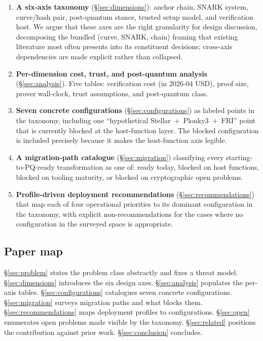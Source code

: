 \begin{enumerate}
  \item \textbf{A six-axis taxonomy} (\S\ref{sec:dimensions}): anchor
    chain, SNARK system, curve/hash pair, post-quantum stance, trusted
    setup model, and verification host. We argue that these axes are
    the right granularity for design discussion, decomposing the
    bundled (curve, SNARK, chain) framing that existing literature
    most often presents into its constituent decisions; cross-axis
    dependencies are made explicit rather than collapsed.
  \item \textbf{Per-dimension cost, trust, and post-quantum
    analysis} (\S\ref{sec:analysis}). Five tables: verification cost
    (in 2026-04 USD), proof size, prover wall-clock, trust
    assumptions, and post-quantum class.
  \item \textbf{Seven concrete configurations}
    (\S\ref{sec:configurations}) as labeled points in the taxonomy,
    including one ``hypothetical Stellar~+~Plonky3~+~FRI'' point that
    is currently blocked at the host-function layer. The blocked
    configuration is included precisely because it makes the
    host-function axis legible.
  \item \textbf{A migration-path catalogue} (\S\ref{sec:migration})
    classifying every starting-to-PQ-ready transformation as one of:
    ready today, blocked on host functions, blocked on tooling
    maturity, or blocked on cryptographic open problems.
  \item \textbf{Profile-driven deployment recommendations}
    (\S\ref{sec:recommendations}) that map each of four operational
    priorities to its dominant configuration in the taxonomy, with
    explicit non-recommendations for the cases where no configuration
    in the surveyed space is appropriate.
\end{enumerate}

\subsection*{Paper map}

\S\ref{sec:problem} states the problem class abstractly and fixes a
threat model. \S\ref{sec:dimensions} introduces the six design axes.
\S\ref{sec:analysis} populates the per-axis tables.
\S\ref{sec:configurations} catalogues seven concrete configurations.
\S\ref{sec:migration} surveys migration paths and what blocks them.
\S\ref{sec:recommendations} maps deployment profiles to
configurations. \S\ref{sec:open} enumerates open problems made visible
by the taxonomy. \S\ref{sec:related} positions the contribution
against prior work. \S\ref{sec:conclusion} concludes.
